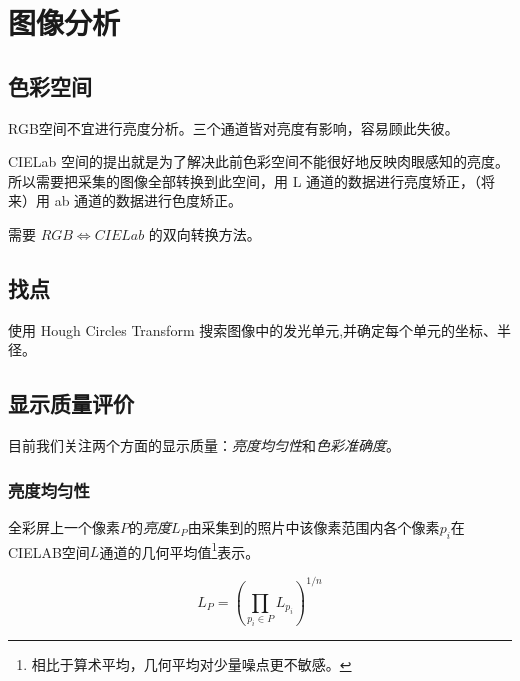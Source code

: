 
\section{图像分析} %
\label{sec:analyze}

\subsection{色彩空间} %
\label{sub:colorspace}

RGB空间不宜进行亮度分析。三个通道皆对亮度有影响，容易顾此失彼。

CIELab 空间的提出就是为了解决此前色彩空间不能很好地反映肉眼感知的亮度。所以需要把采集的图像全部转换到此空间，用 L 通道的数据进行亮度矫正，（将来）用 ab 通道的数据进行色度矫正。

需要 $RGB \Leftrightarrow CIELab$ 的双向转换方法。


\subsection{找点} %
\label{sub:findpixel}

使用 Hough Circles Transform 搜索图像中的发光单元,并确定每个单元的坐标、半径。


\subsection{显示质量评价} %
\label{sub:evaluation}

目前我们关注两个方面的显示质量：\emph{亮度均匀性}和\emph{色彩准确度}。

\subsubsection{亮度均匀性} %
\label{ssub:luminance_uniformity}

\begin{defn}
    全彩屏上一个像素$P$的\emph{亮度}$L_P$由采集到的照片中该像素范围内各个像素$p_i$在CIELAB空间$L$通道的几何平均值\footnote{相比于算术平均，几何平均对少量噪点更不敏感。}表示。

    \begin{equation}
        L_P = \left(\prod_{p_i \in P} L_{p_i} \right)^{1/n}
    \end{equation}
\end{defn}

